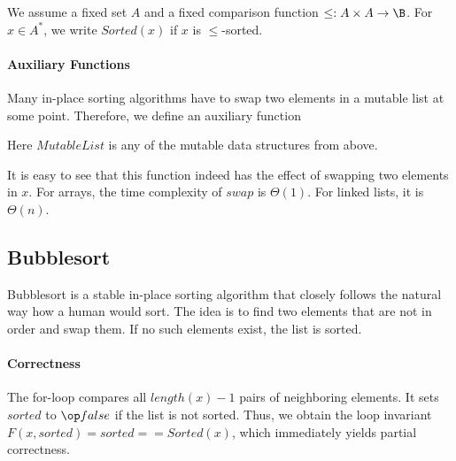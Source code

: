 We assume a fixed set $A$ and a fixed comparison function $\leq:A\times A \to \B$.
For $x\in A^*$, we write $Sorted(x)$ if $x$ is $\leq$-sorted.

\paragraph{Auxiliary Functions}
Many in-place sorting algorithms have to swap two elements in a mutable list at some point.
Therefore, we define an auxiliary function

\begin{acode}
\end{acode}
Here $MutableList$ is any of the mutable data structures from above.

It is easy to see that this function indeed has the effect of swapping two elements in $x$.
For arrays, the time complexity of $swap$ is $\Theta(1)$.
For linked lists, it is $\Theta(n)$.


\subsection{Bubblesort}

Bubblesort is a stable in-place sorting algorithm that closely follows the natural way how a human would sort.
The idea is to find two elements that are not in order and swap them.
If no such elements exist, the list is sorted.

\begin{acode}
\end{acode}

\paragraph{Correctness}
The for-loop compares all $length(x)-1$ pairs of neighboring elements.
It sets $sorted$ to $\false$ if the list is not sorted.
Thus, we obtain the loop invariant $F(x,sorted)=sorted==Sorted(x)$, which immediately yields partial correctness.

